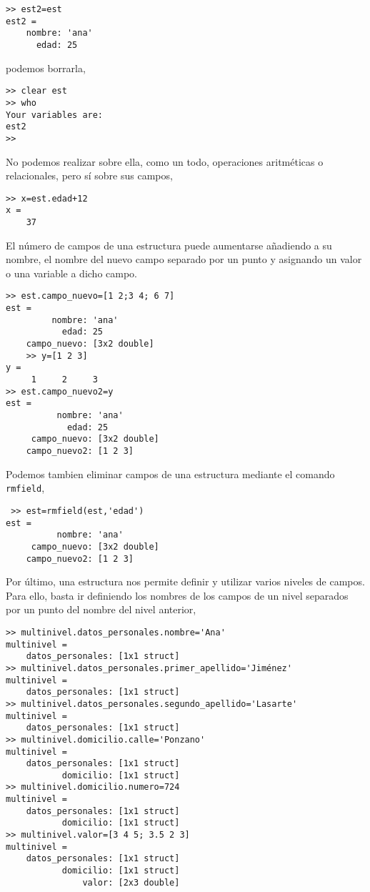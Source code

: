 \begin{verbatim}
>> est2=est
est2 = 
    nombre: 'ana'
      edad: 25
\end{verbatim}
podemos borrarla,

\begin{verbatim}
>> clear est
>> who
Your variables are:
est2  
>> 
\end{verbatim}

No podemos realizar sobre ella, como un todo, operaciones aritméticas o relacionales, pero sí sobre sus campos,

\begin{verbatim}
>> x=est.edad+12
x =
    37
\end{verbatim} 

El número de campos de una estructura puede aumentarse añadiendo a su nombre, el nombre del nuevo campo separado por un punto y asignando un valor o una variable a dicho campo.

\begin{verbatim}
>> est.campo_nuevo=[1 2;3 4; 6 7]
est = 
         nombre: 'ana'
           edad: 25
    campo_nuevo: [3x2 double]
    >> y=[1 2 3]
y =
     1     2     3
>> est.campo_nuevo2=y
est = 
          nombre: 'ana'
            edad: 25
     campo_nuevo: [3x2 double]
    campo_nuevo2: [1 2 3]
\end{verbatim}
 
 Podemos tambien eliminar campos de una estructura mediante el comando \texttt{rmfield},
 
 \begin{verbatim}
 >> est=rmfield(est,'edad')
est = 
          nombre: 'ana'
     campo_nuevo: [3x2 double]
    campo_nuevo2: [1 2 3]
 \end{verbatim}
 
Por último, una estructura nos permite definir y utilizar varios niveles de campos. Para ello, basta ir definiendo los nombres de los campos de un nivel separados por un punto del nombre del nivel anterior, 

\begin{verbatim}
>> multinivel.datos_personales.nombre='Ana'
multinivel = 
    datos_personales: [1x1 struct]
>> multinivel.datos_personales.primer_apellido='Jiménez'
multinivel = 
    datos_personales: [1x1 struct]
>> multinivel.datos_personales.segundo_apellido='Lasarte'
multinivel = 
    datos_personales: [1x1 struct]
>> multinivel.domicilio.calle='Ponzano'
multinivel = 
    datos_personales: [1x1 struct]
           domicilio: [1x1 struct]
>> multinivel.domicilio.numero=724
multinivel = 
    datos_personales: [1x1 struct]
           domicilio: [1x1 struct]
>> multinivel.valor=[3 4 5; 3.5 2 3]
multinivel = 
    datos_personales: [1x1 struct]
           domicilio: [1x1 struct]
               valor: [2x3 double]
\end{verbatim}

